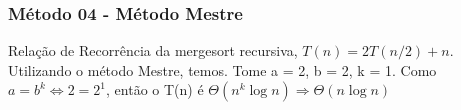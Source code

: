 \subsubsection{Método 04 - Método Mestre}
Relação de Recorrência da mergesort recursiva, $T(n) = 2T(n/2) + n$. Utilizando o método Mestre, temos.
Tome a = 2, b = 2, k = 1. Como $a = b^k \Leftrightarrow 2 = 2^1$, então o T(n) é $\Theta(n^k \log{n}) \Rightarrow \Theta(n \log{n})$